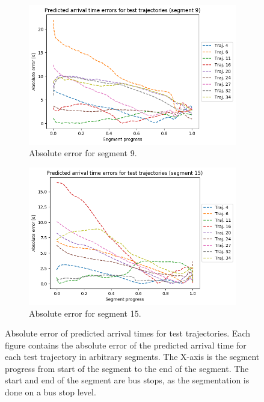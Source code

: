 \begin{figure}[!ht]
\begin{subfigure}[b]{0.475\textwidth}
        \includegraphics[width=\textwidth]{figures/metrics/segment_9}
        \caption[]%
        {{\small Absolute error for segment 9.}}    
        \label{fig:metric-result-3}
    \end{subfigure}
    \quad
    \begin{subfigure}[b]{0.475\textwidth}   
        \centering 
        \includegraphics[width=\textwidth]{figures/metrics/segment_15}
        \caption[]%
        {{\small Absolute error for segment 15.}}    
        \label{fig:metric-result-4}
    \end{subfigure}
    \caption[ Absolute error of predicted arrival times for test trajectories. ]
    {{\small Absolute error of predicted arrival times for test trajectories.
    Each figure contains the absolute error of the predicted arrival time for each test trajectory in arbitrary segments.
    The X-axis is the segment progress from start of the segment to the end of the segment.
    The start and end of the segment are bus stops, as the segmentation is done on a bus stop level.}} 
    \label{fig:arrival-time-metric-timeline}
\end{figure}

